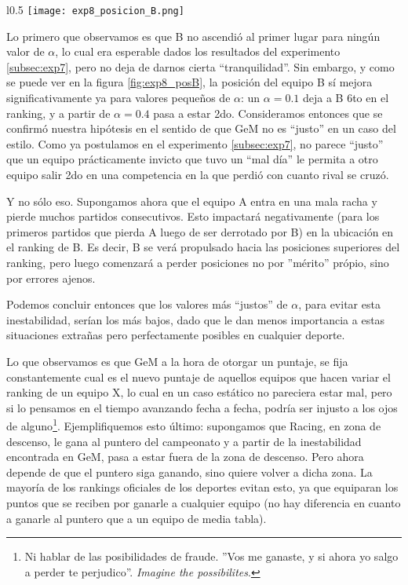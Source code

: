 \begin{wrapfigure}{l}{0.5\textwidth}
    \texttt{[image: exp8\_posicion\_B.png]}
    \caption{Posici\'on del equipo B en el ranking en funci\'on del factor
        $\alpha$ ($c=\alpha$)}
    \label{fig:exp8_posB}
\end{wrapfigure}
\noindent

\par Lo primero que observamos es que B no ascendió al primer lugar para ningún
valor de $\alpha$, lo cual era esperable dados los resultados del experimento
\ref{subsec:exp7}, pero no deja de darnos cierta ``tranquilidad''. Sin embargo,
y como se puede ver en la figura \ref{fig:exp8_posB}, la posición del equipo B
sí mejora significativamente ya para valores pequeños de $\alpha$: un $\alpha =
0.1$ deja a B 6to en el ranking, y a partir de $\alpha = 0.4$ pasa a estar 2do.
Consideramos entonces que se confirmó nuestra hipótesis en el sentido de que GeM
no es ``justo'' en un caso del estilo. Como ya postulamos en el experimento
\ref{subsec:exp7}, no parece ``justo'' que un equipo prácticamente invicto que
tuvo un ``mal día'' le permita a otro equipo salir 2do en una competencia en la
que perdió con cuanto rival se cruzó.

\par Y no s\'olo eso. Supongamos ahora que el equipo A entra en una mala racha
y pierde muchos partidos consecutivos. Esto impactar\'a negativamente (para los
primeros partidos que pierda A luego de ser derrotado por B) en la ubicaci\'on
en el ranking de B. Es decir, B se ver\'a propulsado hacia las posiciones
superiores del ranking, pero luego comenzar\'a a perder posiciones no por
''m\'erito'' pr\'opio, sino por errores ajenos.

\par Podemos concluir entonces que los valores más ``justos'' de $\alpha$, para
evitar esta inestabilidad, serían los más bajos, dado que le dan menos
importancia a estas situaciones extrañas pero perfectamente posibles en
cualquier deporte.

\par Lo que observamos es que GeM a la hora de otorgar un puntaje, se fija
constantemente cual es el nuevo puntaje de aquellos equipos que hacen variar el
ranking de un equipo X, lo cual en un caso est\'atico no pareciera estar mal,
pero si lo pensamos en el tiempo avanzando fecha a fecha, podr\'ia ser injusto a
los ojos de alguno\footnote{Ni hablar de las posibilidades de fraude. ''Vos me
ganaste, y si ahora yo salgo a perder te perjudico''. \emph{Imagine the
possibilites}.}. Ejemplifiquemos esto \'ultimo: supongamos que Racing, en zona
de descenso, le gana al puntero del campeonato y a partir de la inestabilidad
encontrada en GeM, pasa a estar fuera de la zona de descenso. Pero ahora depende
de que el puntero siga ganando, sino quiere volver a dicha zona. La mayor\'ia de
los rankings oficiales de los deportes evitan esto, ya que equiparan los puntos
que se reciben por ganarle a cualquier equipo (no hay diferencia en cuanto a
ganarle al puntero que a un equipo de media tabla).

